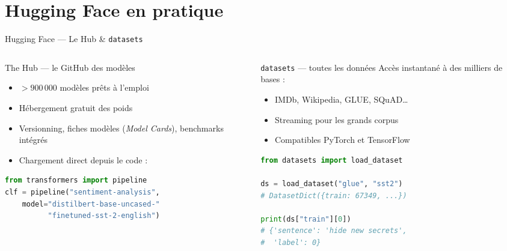 \documentclass[aspectratio=169, 10pt]{beamer}
\begin{document}
\section{Hugging Face en pratique}

\begin{frame}[fragile]{Hugging Face --- Le Hub \& \texttt{datasets}}
  \begin{columns}[T]
    \begin{column}{0.50\textwidth}
      \begin{block}{The Hub --- le GitHub des modèles}
        \begin{itemize}
          \item $> 900\,000$ modèles prêts à l'emploi
          \item Hébergement gratuit des poids
          \item Versionning, fiches modèles (\textit{Model Cards}),
                benchmarks intégrés
          \item Chargement direct depuis le code :
        \end{itemize}
\begin{lstlisting}[language=Python, basicstyle=\tiny\ttfamily]
from transformers import pipeline
clf = pipeline("sentiment-analysis",
    model="distilbert-base-uncased-"
          "finetuned-sst-2-english")
\end{lstlisting}
      \end{block}
    \end{column}
    \begin{column}{0.46\textwidth}
      \begin{exampleblock}{\texttt{datasets} --- toutes les données}
        Accès instantané à des milliers de bases :
        \begin{itemize}
          \item IMDb, Wikipedia, GLUE, SQuAD\ldots
          \item Streaming pour les grands corpus
          \item Compatibles PyTorch et TensorFlow
        \end{itemize}
      \end{exampleblock}
\begin{lstlisting}[language=Python, basicstyle=\tiny\ttfamily]
from datasets import load_dataset

ds = load_dataset("glue", "sst2")
# DatasetDict({train: 67349, ...})

print(ds["train"][0])
# {'sentence': 'hide new secrets',
#  'label': 0}
\end{lstlisting}
    \end{column}
  \end{columns}
\end{frame}
\end{document}

